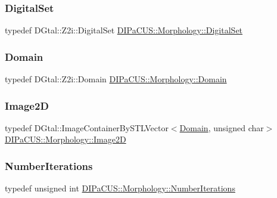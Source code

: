 \subsubsection{\texorpdfstring{Digital\+Set}{DigitalSet}}
{\footnotesize\ttfamily typedef D\+Gtal\+::\+Z2i\+::\+Digital\+Set \hyperlink{namespaceDIPaCUS_1_1Morphology_ab69fa725716b0ed4c311c0d00a292be7}{D\+I\+Pa\+C\+U\+S\+::\+Morphology\+::\+Digital\+Set}}

\mbox{\label{namespaceDIPaCUS_1_1Morphology_ab9f5fc1118b80b969855f77bee7d9914}} 
\subsubsection{\texorpdfstring{Domain}{Domain}}
{\footnotesize\ttfamily typedef D\+Gtal\+::\+Z2i\+::\+Domain \hyperlink{namespaceDIPaCUS_1_1Morphology_ab9f5fc1118b80b969855f77bee7d9914}{D\+I\+Pa\+C\+U\+S\+::\+Morphology\+::\+Domain}}

\mbox{\label{namespaceDIPaCUS_1_1Morphology_a9aff9edf28d681accfc54435fbefcbee}} 
\subsubsection{\texorpdfstring{Image2D}{Image2D}}
{\footnotesize\ttfamily typedef D\+Gtal\+::\+Image\+Container\+By\+S\+T\+L\+Vector$<$\hyperlink{namespaceDIPaCUS_1_1Morphology_ab9f5fc1118b80b969855f77bee7d9914}{Domain}, unsigned char$>$ \hyperlink{namespaceDIPaCUS_1_1Morphology_a9aff9edf28d681accfc54435fbefcbee}{D\+I\+Pa\+C\+U\+S\+::\+Morphology\+::\+Image2D}}

\mbox{\label{namespaceDIPaCUS_1_1Morphology_a8ffa7d1c2023be8b21bc87a4b7df7cca}} 
\subsubsection{\texorpdfstring{Number\+Iterations}{NumberIterations}}
{\footnotesize\ttfamily typedef unsigned int \hyperlink{namespaceDIPaCUS_1_1Morphology_a8ffa7d1c2023be8b21bc87a4b7df7cca}{D\+I\+Pa\+C\+U\+S\+::\+Morphology\+::\+Number\+Iterations}}


